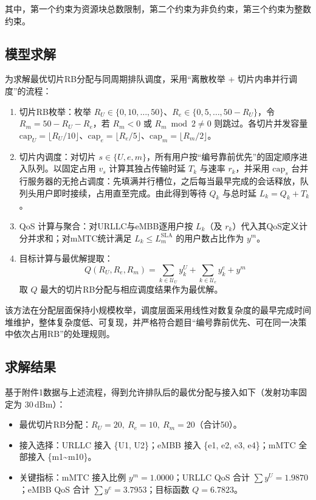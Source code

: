 其中，第一个约束为资源块总数限制，第二个约束为非负约束，第三个约束为整数约束。
\subsection{模型求解}
为求解最优切片RB分配与同周期排队调度，采用“离散枚举 + 切片内串并行调度”的流程：

\begin{enumerate}
  \item 切片RB枚举：枚举 $R_U\in\{0,10,\dots,50\}$、$R_e\in\{0,5,\dots,50-R_U\}$，令 $R_m=50-R_U-R_e$，若 $R_m<0$ 或 $R_m\bmod 2\ne 0$ 则跳过。各切片并发容量 $\mathrm{cap}_U=\lfloor R_U/10\rfloor$、$\mathrm{cap}_e=\lfloor R_e/5\rfloor$、$\mathrm{cap}_m=\lfloor R_m/2\rfloor$。
  \item 切片内调度：对切片 $s\in\{U,e,m\}$，所有用户按“编号靠前优先”的固定顺序进入队列。以固定占用 $v_s$ 计算其独占传输时延 $T_k$ 与速率 $r_k$，并采用 $\mathrm{cap}_s$ 台并行服务器的无抢占调度：先填满并行槽位，之后每当最早完成的会话释放，队列头用户即时接续，占用直至完成。由此得到等待 $Q_k$ 与总时延 $L_k=Q_k+T_k$。
  \item QoS 计算与聚合：对URLLC与eMBB逐用户按 $L_k$（及 $r_k$）代入其QoS定义计分并求和；对mMTC统计满足 $L_k\le L_m^{\mathrm{SLA}}$ 的用户数占比作为 $y^{m}$。
  \item 目标计算与最优解提取：
  \[
    Q(R_U,R_e,R_m)=\sum_{k\in\mathcal U_U} y_k^U + \sum_{k\in\mathcal U_e} y_k^e + y^{m}
  \]
  取 $Q$ 最大的切片RB分配与相应调度结果作为最优解。
\end{enumerate}

该方法在分配层面保持小规模枚举，调度层面采用线性对数复杂度的最早完成时间堆维护，整体复杂度低、可复现，并严格符合题目“编号靠前优先、可在同一决策中依次占用RB”的处理规则。

\subsection{求解结果}

基于附件1数据与上述流程，得到允许排队后的最优分配与接入如下（发射功率固定为 $30\,\mathrm{dBm}$）：

\begin{itemize}
  \item 最优切片RB分配：$R_U=20,\ R_e=10,\ R_m=20$（合计50）。
  \item 接入选择：URLLC 接入 \{U1, U2\}；eMBB 接入 \{e1, e2, e3, e4\}；mMTC 全部接入 \{m1\textasciitilde m10\}。
  \item 关键指标：mMTC 接入比例 $y^{m}=1.0000$；URLLC QoS 合计 $\sum y^{U}=1.9870$；eMBB QoS 合计 $\sum y^{e}=3.7953$；目标函数 $Q=6.7823$。
\end{itemize}

